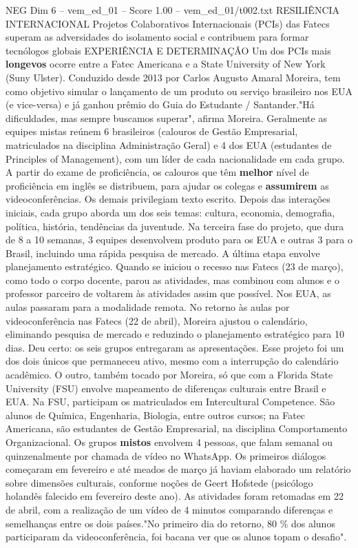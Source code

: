\begin{textsample}{NEG Dim 6 – vem\_ed\_01 – Score 1.00 – vem\_ed\_01/t002.txt}  \label{ex:f6_neg_081}
RESILIÊNCIA INTERNACIONAL Projetos Colaborativos Internacionais (PCIs) das Fatecs superam as adversidades do isolamento social e contribuem para formar tecnólogos globais EXPERIÊNCIA E DETERMINAÇÃO Um dos PCIs mais \textbf{longevos} ocorre entre a Fatec Americana e a State University of New York (Suny Ulster).
Conduzido desde 2013 por Carlos Augusto Amaral Moreira, tem como objetivo simular o lançamento de um produto ou serviço brasileiro nos EUA (e vice-versa) e já ganhou prêmio do Guia do Estudante / Santander."Há dificuldades, mas sempre buscamos superar", afirma Moreira.
Geralmente as equipes mistas reúnem 6 brasileiros (calouros de Gestão Empresarial, matriculados na disciplina Administração Geral) e 4 dos EUA (estudantes de Principles of Management), com um líder de cada nacionalidade em cada grupo.
A partir do exame de proficiência, os calouros que têm \textbf{melhor} nível de proficiência em inglês se distribuem, para ajudar os colegas e \textbf{assumirem} as videoconferências.
Os demais privilegiam texto escrito.
Depois das interações iniciais, cada grupo aborda um dos seis temas: cultura, economia, demografia, política, história, tendências da juventude.
Na terceira fase do projeto, que dura de 8 a 10 semanas, 3 equipes desenvolvem produto para os EUA e outras 3 para o Brasil, incluindo uma rápida pesquisa de mercado.
A última etapa envolve planejamento estratégico.
Quando se iniciou o recesso nas Fatecs (23 de março), como todo o corpo docente, parou as atividades, mas combinou com alunos e o professor parceiro de voltarem às atividades assim que possível.
Nos EUA, as aulas passaram para a modalidade remota.
No retorno às aulas por videoconferência nas Fatecs (22 de abril), Moreira ajustou o calendário, eliminando pesquisa de mercado e reduzindo o planejamento estratégico para 10 dias.
Deu certo: os seis grupos entregaram as apresentações.
Esse projeto foi um dos dois únicos que permaneceu ativo, mesmo com a interrupção do calendário acadêmico.
O outro, também tocado por Moreira, só que com a Florida State University (FSU) envolve mapeamento de diferenças culturais entre Brasil e EUA.
Na FSU, participam os matriculados em Intercultural Competence.
São alunos de Química, Engenharia, Biologia, entre outros cursos; na Fatec Americana, são estudantes de Gestão Empresarial, na disciplina Comportamento Organizacional.
Os grupos \textbf{mistos} envolvem 4 pessoas, que falam semanal ou quinzenalmente por chamada de vídeo no WhatsApp.
Os primeiros diálogos começaram em fevereiro e até meados de março já haviam elaborado um relatório sobre dimensões culturais, conforme noções de Geert Hofstede (psicólogo holandês falecido em fevereiro deste ano).
As atividades foram retomadas em 22 de abril, com a realização de um vídeo de 4 minutos comparando diferenças e semelhanças entre os dois países."No primeiro dia do retorno, 80 \% dos alunos participaram da videoconferência, foi bacana ver que os alunos topam o desafio".

\end{textsample}
